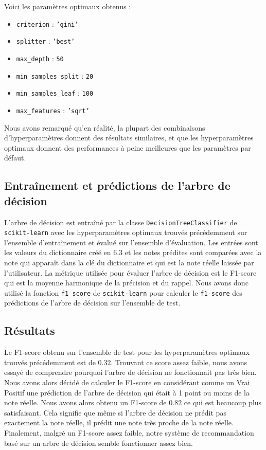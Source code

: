 \documentclass{article}
\begin{document}
\noindent Voici les paramètres optimaux obtenus :

\begin{itemize}
  \item \texttt{criterion} : \texttt{'gini'}
  \item \texttt{splitter} : \texttt{'best'}
  \item \texttt{max\_depth} : \texttt{50}
  \item \texttt{min\_samples\_split} : \texttt{20}
  \item \texttt{min\_samples\_leaf} : \texttt{100}
  \item \texttt{max\_features} : \texttt{'sqrt'}
\end{itemize}

Nous avons remarqué qu'en réalité, la plupart des combinaisons d'hyperparamètres
donnent des résultats similaires, et que les hyperparamètres optimaux donnent
des performances à peine meilleures que les paramètres par défaut.

\subsection{Entraînement et prédictions de l'arbre de décision}
L'arbre de décision est entraîné par la classe \texttt{DecisionTreeClassifier}
de \texttt{scikit-learn} avec les hyperparamètres optimaux trouvés précédemment 
sur l'ensemble d'entraînement et évalué sur l'ensemble d'évaluation.
\vskip 0.25cm
Les entrées sont les valeurs du dictionnaire créé en 6.3 et les notes prédites
sont comparées avec la note qui apparaît dans la clé du dictionnaire et qui est
la note réelle laissée par l'utilisateur.
\vskip 0.25cm
La métrique utilisée pour évaluer l'arbre de décision est le F1-score
qui est la moyenne harmonique de la précision et du rappel. Nous avons donc 
utilisé la fonction \texttt{f1\_score} de \texttt{scikit-learn} pour calculer
le \texttt{f1-score} des prédictions de l'arbre de décision sur l'ensemble
de test.

\subsection{Résultats}
Le F1-score obtenu sur l'ensemble de test pour les hyperparamètres optimaux
trouvés précédemment est de $0.32$.
\vskip 0.25cm
Trouvant ce score assez faible, nous avons essayé de comprendre pourquoi
l'arbre de décision ne fonctionnait pas très bien. Nous avons alors décidé
de calculer le F1-score en considérant comme un Vrai Positif une prédiction
de l'arbre de décision qui était à 1 point ou moins de la note réelle.
\vskip 0.25cm
Nous avons alors obtenu un F1-score de $0.82$ ce qui est beaucoup plus
satisfaisant. Cela signifie que même si l'arbre de décision ne prédit pas
exactement la note réelle, il prédit une note très proche de la note réelle.
\vskip 0.25cm
Finalement, malgré un F1-score assez faible, notre système de recommandation
basé sur un arbre de décision semble fonctionner assez bien.
\end{document}
